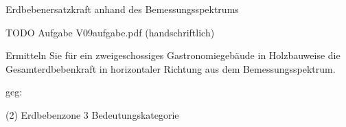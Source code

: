 Erdbebenersatzkraft anhand des Bemessungsspektrums

\smallskip

TODO Aufgabe V09aufgabe.pdf (handschriftlich)



Ermitteln Sie für ein zweigeschossiges Gastronomiegebäude in Holzbauweise die Gesamterdbebenkraft in horizontaler Richtung
aus dem Bemessungsspektrum.

\begin{minipage}[t]{\linewidth}
    geg:
    \begin{tasks} (2)
        \task[] Erdbebenzone 3
        \task[] Bedeutungskategorie 
    \end{tasks}
\end{minipage}
